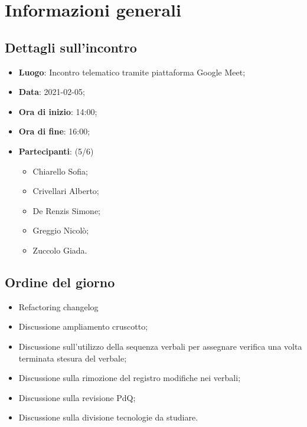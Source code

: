 \section{Informazioni generali}

\subsection{Dettagli sull'incontro}
\begin{itemize}
\item \textbf{Luogo}: Incontro telematico tramite piattaforma Google Meet;
\item \textbf{Data}: 2021-02-05;
\item \textbf{Ora di inizio}: 14:00;
\item \textbf{Ora di fine}: 16:00;
\item \textbf{Partecipanti}: (5/6)
\begin{itemize}
	\item Chiarello Sofia;
    \item Crivellari Alberto;
    \item De Renzis Simone;
    \item Greggio Nicolò;
    \item Zuccolo Giada.
\end{itemize}
\end{itemize}

\subsection{Ordine del giorno}
\begin{itemize}
	\item Refactoring changelog
	\item Discussione ampliamento cruscotto;
	\item Discussione sull'utilizzo della sequenza verbali per assegnare verifica una volta terminata stesura del verbale;
	\item Discussione sulla rimozione del registro modifiche nei verbali;
	\item Discussione sulla revisione PdQ;
	\item Discussione sulla divisione tecnologie da studiare.
\end{itemize}


